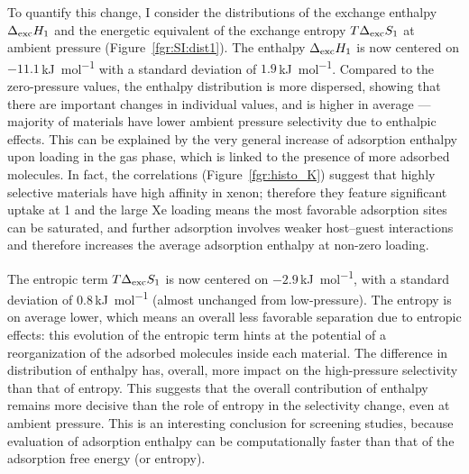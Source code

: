 \documentclass[main.tex]{subfiles}
\begin{document}
To quantify this change, I consider the distributions of the exchange enthalpy $\Delta_{\text{exc}}H_{\text{1}}$ and the energetic equivalent of the exchange entropy $T\Delta_{\text{exc}}S_{\text{1}}$ at ambient pressure (Figure~\ref{fgr:SI:dist1}). The enthalpy $\Delta_{\text{exc}}H_{\text{1}}$ is now centered on $-11.1$\,\si{\kilo\joule\per\mol} with a standard deviation of $1.9$\,\si{\kilo\joule\per\mol}. Compared to the zero-pressure values, the enthalpy distribution is more dispersed, showing that there are important changes in individual values, and is higher in average --- majority of materials have lower ambient pressure selectivity due to enthalpic effects. This can be explained by the very general increase of adsorption enthalpy upon loading in the gas phase, which is linked to the presence of more adsorbed molecules. In fact, the correlations (Figure~\ref{fgr:histo_K}) suggest that highly selective materials have high affinity in xenon; therefore they feature significant uptake at \SI{1}{\atm} and the large Xe loading means the most favorable adsorption sites can be saturated, and further adsorption involves weaker host--guest interactions and therefore increases the average adsorption enthalpy at non-zero loading.

The entropic term $T\Delta_{\text{exc}}S_{\text{1}}$ is now centered on $-2.9$\,\si{\kilo\joule\per\mol}, with a standard deviation of $0.8$\,\si{\kilo\joule\per\mol} (almost unchanged from low-pressure). The entropy is on average lower, which means an overall less favorable separation due to entropic effects: this evolution of the entropic term hints at the potential of a reorganization of the adsorbed molecules inside each material. The difference in distribution of enthalpy has, overall, more impact on the high-pressure selectivity than that of entropy. This suggests that the overall contribution of enthalpy remains more decisive than the role of entropy in the selectivity change, even at ambient pressure. This is an interesting conclusion for screening studies, because evaluation of adsorption enthalpy can be computationally faster than that of the adsorption free energy (or entropy).
\end{document}
